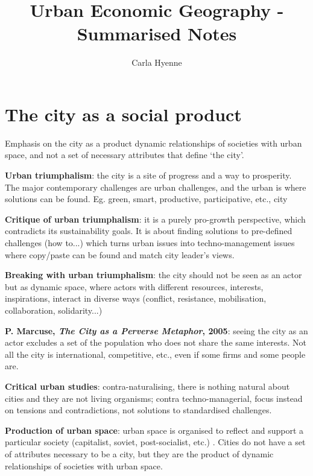 \documentclass{article}
\title{Urban Economic Geography - Summarised Notes}
\author{Carla Hyenne }
\newcommand{\alignedmarginpar}[1]{%
        \marginpar{\raggedright\small #1}
    }
\begin{document}
\maketitle

\tableofcontents

\pagebreak

\section{The city as a social product}

Emphasis on the city as a product dynamic relationships of societies with urban space, and not a set of necessary attributes that define `the city'. 

\textbf{Urban triumphalism}: the city is a site of progress and a way to prosperity. The major contemporary challenges are urban challenges, and the urban is where solutions can be found. Eg. green, smart, productive, participative, etc., city \alignedmarginpar{Glaeser}

\textbf{Critique of urban triumphalism}: it is a purely pro-growth perspective, which contradicts its sustainability goals. It is about finding solutions to pre-defined challenges (how to...) which turns urban issues into techno-management issues where copy/paste can be found and match city leader's views.

\textbf{Breaking with urban triumphalism}:  the city should not be seen as an actor but as dynamic space, where actors with different resources, interests, inspirations, interact in diverse ways (conflict, resistance, mobilisation, collaboration, solidarity...)\alignedmarginpar{Marcuse}

\textbf{P. Marcuse, \textit{The City as a Perverse Metaphor}, 2005}: seeing the city as an actor excludes a set of the population who does not share the same interests. Not all the city is international, competitive, etc., even if some firms and some people are.

\textbf{Critical urban studies}: contra-naturalising, there is nothing natural about cities and they are not living organisms; contra techno-managerial, focus instead on tensions and contradictions, not solutions to standardised challenges.\alignedmarginpar{Lefebvre}

\textbf{Production of urban space}: urban space is organised to reflect and support a particular society (capitalist, soviet, post-socialist, etc.)\alignedmarginpar{LA vs. Moscow}. Cities do not have a set of attributes necessary to be a city, but they are the product of dynamic relationships of societies with urban space.
\end{document}
